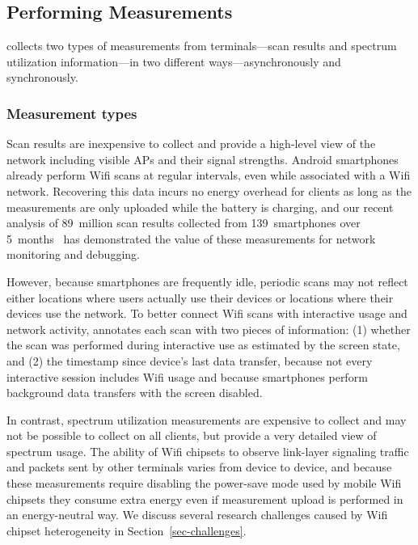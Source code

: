 \subsection{Performing Measurements}
\label{subsec-measurement}

\PS{} collects two types of measurements from terminals---scan results and
spectrum utilization information---in two different ways---asynchronously and
synchronously.

\subsubsection{Measurement types}

Scan results are inexpensive to collect and provide a high-level view of the
network including visible APs and their signal strengths. Android smartphones
already perform Wifi scans at regular intervals, even while associated with a
Wifi network. Recovering this data incurs no energy overhead for clients as
long as the measurements are only uploaded while the battery is charging, and
our recent analysis of 89~million scan results collected from 139~smartphones
over 5~months~\cite{conext14-pocketsniffer} has demonstrated the value of
these measurements for network monitoring and debugging.

However, because smartphones are frequently idle, periodic scans may not
reflect either locations where users actually use their devices or locations
where their devices use the network. To better connect Wifi scans with
interactive usage and network activity, \PS{} annotates each scan with two
pieces of information: (1) whether the scan was performed during interactive
use as estimated by the screen state, and (2) the timestamp since device's last
data transfer, because not every interactive session includes Wifi usage and
because smartphones perform background data transfers with the screen
disabled.

In contrast, spectrum utilization measurements are expensive to collect and
may not be possible to collect on all clients, but provide a very detailed
view of spectrum usage. The ability of Wifi chipsets to observe link-layer
signaling traffic and packets sent by other terminals varies from device to
device, and because these measurements require disabling the power-save mode
used by mobile Wifi chipsets they consume extra energy even if measurement
upload is performed in an energy-neutral way. We discuss several research
challenges caused by Wifi chipset heterogeneity in
Section~\ref{sec-challenges}.

